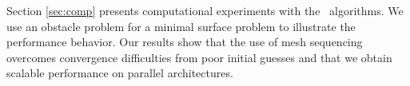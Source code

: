 Section \ref{sec:comp} presents computational experiments with
the \tao\ algorithms. We use an obstacle problem
for a minimal surface problem to illustrate the performance
behavior. Our results show that the use of mesh sequencing
overcomes convergence difficulties from poor initial guesses
and that we obtain scalable performance on parallel architectures.


